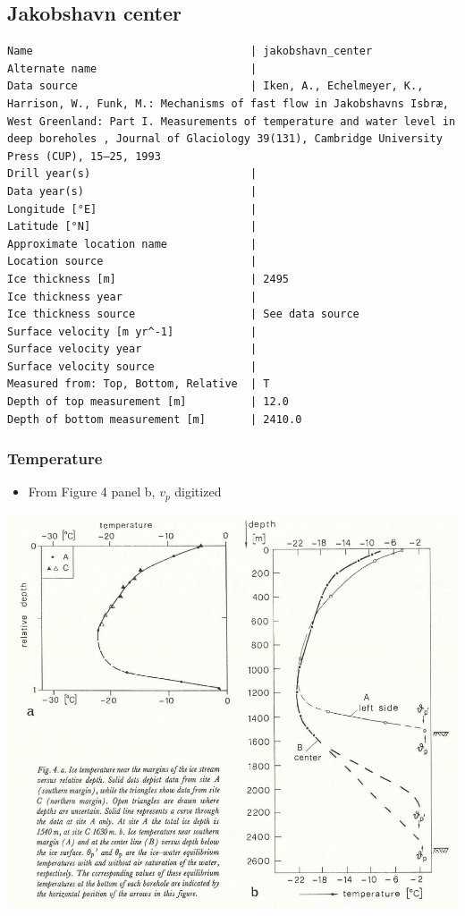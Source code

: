 \documentclass[article,a4paper,times,11pt,twoside]{article}
\begin{document}
\subsection{Jakobshavn center}
\label{sec:org443fb6b}
\begin{verbatim}
Name                                  | jakobshavn_center
Alternate name                        | 
Data source                           | Iken, A., Echelmeyer, Κ., Harrison, W., Funk, M.: Mechanisms of fast flow in Jakobshavns Isbræ, West Greenland: Part I. Measurements of temperature and water level in deep boreholes , Journal of Glaciology 39(131), Cambridge University Press (CUP), 15–25, 1993 
Drill year(s)                         | 
Data year(s)                          | 
Longitude [°E]                        | 
Latitude [°N]                         | 
Approximate location name             | 
Location source                       | 
Ice thickness [m]                     | 2495
Ice thickness year                    | 
Ice thickness source                  | See data source
Surface velocity [m yr^-1]            | 
Surface velocity year                 | 
Surface velocity source               | 
Measured from: Top, Bottom, Relative  | T
Depth of top measurement [m]          | 12.0
Depth of bottom measurement [m]       | 2410.0
\end{verbatim}

\subsubsection{Temperature}
\label{sec:org351ea2c}

\begin{itemize}
\item From \textcite{iken_1993} Figure 4 panel b, \(v_p\) digitized
\end{itemize}

\begin{center}
\includegraphics[width=.9\linewidth]{jakobshavn_center/iken_1993_fig4.png}
\end{center}
\end{document}
